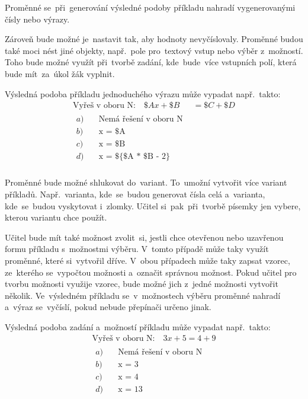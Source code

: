 \documentclass[14pt,a4paper]{article}
\begin{document}
        Proměnné se~při~generování výsledné podoby příkladu nahradí vygenerovanými čísly nebo výrazy.
        
        Zároveň bude možné je~nastavit tak, aby hodnoty nevyčíslovaly. Proměnné budou také moci nést jiné objekty, např.~pole pro~textový vstup nebo výběr z~možností. Toho bude možné využít při~tvorbě zadání, kde~bude~více vstupních polí, která bude mít~za~úkol žák vyplnit.

        Výsledná podoba příkladu jednoduchého výrazu může vypadat např.~takto:
        \begin{align*}
            \text{Vyřeš v oboru N:} \quad \$Ax + \$B &= \$C + \$D \\
            \begin{aligned}
                a) \quad &\text{Nemá řešení v oboru N} \\
                b) \quad &\text{x = \$A} \\
                c) \quad &\text{x = \$B} \\
                d) \quad &\text{x = \$\{\$A * \$B - 2\}} \\
            \end{aligned}
        \end{align*}

        Proměnné bude možné shlukovat do~variant. To~umožní vytvořit více variant příkladů. Např.~varianta, kde~se~budou generovat čísla celá a~varianta, kde~se~budou vyskytovat i~zlomky. Učitel si~pak~při~tvorbě písemky jen vybere, kterou variantu chce použít.

        Učitel bude mít také možnost zvolit~si, jestli chce otevřenou nebo uzavřenou formu příkladu s~možnostmi výběru. V~tomto případě může taky využít proměnné, které si~vytvořil dříve. V~obou případech může taky zapsat vzorec, ze~kterého se~vypočtou možnosti a~označit správnou možnost. Pokud učitel pro tvorbu možnosti využije vzorec, bude možné jich z~jedné možnosti vytvořit několik. Ve~výsledném příkladu se~v~možnostech výběru proměnné nahradí a~výraz se~vyčíslí, pokud nebude přepínači určeno jinak.

        Výsledná podoba zadání a~možností příkladu může vypadat např.~takto:
        \begin{align*}
            \text{Vyřeš v oboru N:} \quad 3x + 5 = 4 + 9 \\
            \begin{aligned}
                a) \quad &\text{Nemá řešení v oboru N} \\
                b) \quad &\text{x = 3} \\
                c) \quad &\text{x = 4} \\
                d) \quad &\text{x = 13} \\
            \end{aligned}
        \end{align*}
\end{document}
